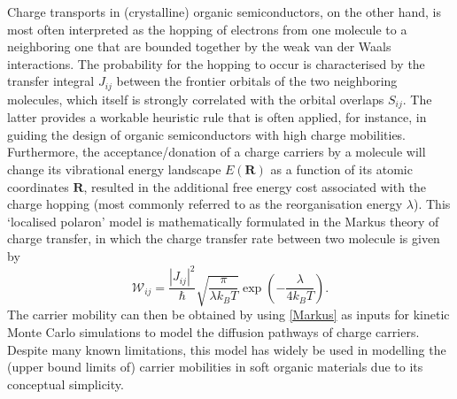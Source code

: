 Charge transports in (crystalline) organic semiconductors, on the other hand, is most often interpreted as the hopping of electrons from one molecule to a neighboring one that are bounded together by the weak van der Waals interactions.\cite{coropceanu2007charge} The probability for the hopping to occur is characterised by the transfer integral $J_{ij}$ between the frontier orbitals of the two neighboring molecules, which itself is strongly correlated with the orbital overlaps $S_{ij}$.\cite{gajdos2014ultrafast} The latter provides a workable heuristic rule that is often applied, for instance, in guiding the design of organic semiconductors with high charge mobilities.\cite{li1998highly,takimiya2011thienoacene,gomez2017hydrogen,campbell2017predicted,yang2018large} Furthermore, the acceptance/donation of a charge carriers by a molecule will change its vibrational energy landscape $E(\bm{R})$ as a function of its atomic coordinates $\bm{R}$, resulted in the additional free energy cost associated with the charge hopping (most commonly referred to as the reorganisation energy $\lambda$). This `localised polaron' model is mathematically formulated in the Markus theory of charge transfer,\cite{marcus1993electron} in which the charge transfer rate between two molecule is given by
\begin{equation}\label{Markus}
\mathcal{W}_{ij}=\frac{|J_{ij}|^2}{\hbar}\sqrt{\frac{\pi}{\lambda k_B T}}\exp\left(-\frac{\lambda}{4k_{B}T}\right).
\end{equation}
The carrier mobility can then be obtained by using \cref{Markus} as inputs for  kinetic Monte Carlo simulations to model the diffusion pathways of charge carriers.\cite{coropceanu2007charge} Despite many known limitations,\cite{shuai2020applying} this model has widely be used in modelling the (upper bound limits of)  carrier mobilities in soft organic materials due to its conceptual simplicity. 

